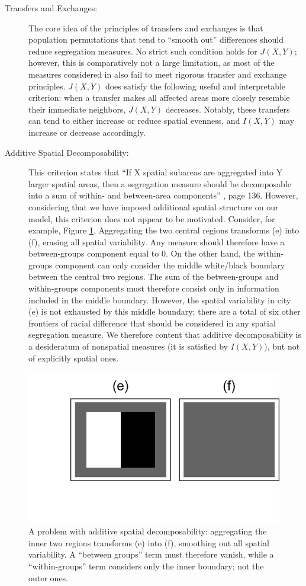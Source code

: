\begin{description}
		\item[Transfers and Exchanges:] The core idea of the principles of transfers and exchanges is that population permutations that tend to ``smooth out'' differences should reduce segregation measures. No strict such condition holds for $J(X,Y)$; however, this is comparatively not a large limitation, as most of the measures considered in \cite{Reardon2004} also fail to meet rigorous transfer and exchange principles. $J(X,Y)$ does satisfy the following useful and interpretable criterion: when a transfer makes all affected areas more closely resemble their immediate neighbors, $J(X,Y)$ decreases. Notably, these transfers can tend to either increase or reduce spatial evenness, and $I(X,Y)$ may increase or decrease accordingly. 
		\item[Additive Spatial Decomposability:] This criterion states that ``If X spatial subareas are aggregated into Y larger spatial areas, then a segregation measure should be decomposable into a sum of within- and between-area components'' \cite{Reardon2004}, page 136. However, considering that we have imposed additional spatial structure on our model, this criterion does not appear to be motivated. Consider, for example, Figure \ref{fig:decomposability}. Aggregating the two central regions transforms (e) into (f), erasing all spatial variability. Any measure should therefore have a between-groups component equal to 0. On the other hand, the within-groups component can only consider the middle white/black boundary between the central two regions. The sum of the between-groups and within-groups components must therefore consist only in information included in the middle boundary. However, the spatial variability in city (e) is not exhausted by this middle boundary; there are a total of six other frontiers of racial difference that should be considered in any spatial segregation measure. We therefore content that additive decomposability is a desideratum of nonspatial measures (it is satisfied by $I(X,Y)$), but not of explicitly spatial ones. 
	\end{description}
	
	\begin{figure}
		\centering
		\includegraphics[width=.5\textwidth]{figs/decomposability.png}
		\caption{A problem with additive spatial decomposability: aggregating the inner two regions transforms (e) into (f), smoothing out all spatial variability. A ``between groups'' term must therefore vanish, while a ``within-groups'' term considers only the inner boundary; not the outer ones.}
		\label{fig:decomposability}
	\end{figure}
	
